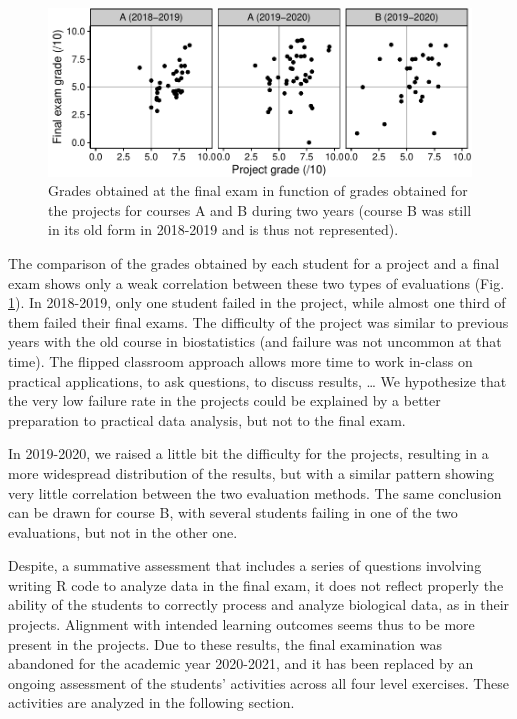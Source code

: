 \documentclass{aims}
\theoremstyle{definition}
\begin{document}
\begin{figure}
\includegraphics[width=1\linewidth]{teaching_data_science_files/figure-latex/fig_exams_projects-1} \caption{\label{fig:fig_exams_projects}  Grades obtained at the final exam in function of grades obtained for the projects for courses A and B during two years (course B was still in its old form in 2018-2019 and is thus not represented).}\label{fig:fig_exams_projects}
\end{figure}

The comparison of the grades obtained by each student for a project and
a final exam shows only a weak correlation between these two types of
evaluations (Fig. \ref {fig:fig_exams_projects}). In 2018-2019, only one
student failed in the project, while almost one third of them failed
their final exams. The difficulty of the project was similar to previous
years with the old course in biostatistics (and failure was not uncommon
at that time). The flipped classroom approach allows more time to work
in-class on practical applications, to ask questions, to discuss
results, \ldots{} We hypothesize that the very low failure rate in the
projects could be explained by a better preparation to practical data
analysis, but not to the final exam.

In 2019-2020, we raised a little bit the difficulty for the projects,
resulting in a more widespread distribution of the results, but with a
similar pattern showing very little correlation between the two
evaluation methods. The same conclusion can be drawn for course B, with
several students failing in one of the two evaluations, but not in the
other one.

Despite, a summative assessment that includes a series of questions
involving writing R code to analyze data in the final exam, it does not
reflect properly the ability of the students to correctly process and
analyze biological data, as in their projects. Alignment with intended
learning outcomes seems thus to be more present in the projects. Due to
these results, the final examination was abandoned for the academic year
2020-2021, and it has been replaced by an ongoing assessment of the
students' activities across all four level exercises. These activities
are analyzed in the following section.
\end{document}
